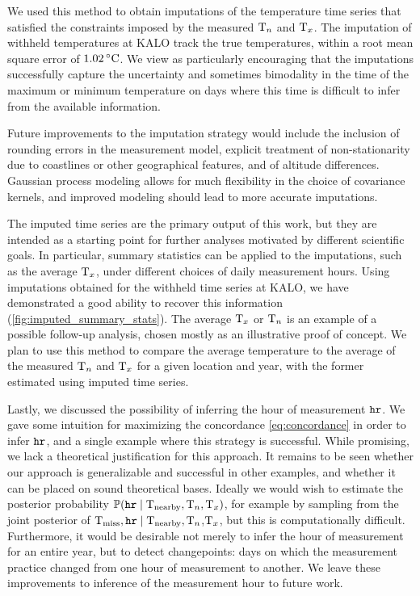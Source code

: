 \documentclass[12pt]{article}
\begin{document}
We used this method to obtain imputations of the temperature time series that satisfied the constraints imposed by the measured \(\Tn\) and \(\Tx\).
The imputation of withheld temperatures at KALO track the true temperatures, within a root mean square error of \(1.02\,\degreeC\).
We view as particularly encouraging that the imputations successfully capture the uncertainty and sometimes bimodality in the time of the maximum or minimum temperature on days where this time is difficult to infer from the available information.

Future improvements to the imputation strategy would include the inclusion of rounding errors in the measurement model, explicit treatment of non-stationarity due to coastlines or other geographical features, and of altitude differences.
Gaussian process modeling allows for much flexibility in the choice of covariance kernels, and improved modeling should lead to more accurate imputations.

The imputed time series are the primary output of this work, but they are intended as a starting point for further analyses motivated by different scientific goals.
In particular, summary statistics can be applied to the imputations, such as the average \(\Tx\), under different choices of daily measurement hours.
Using imputations obtained for the withheld time series at KALO, we have demonstrated a good ability to recover this information (\autoref{fig:imputed_summary_stats}).
The average \(\Tx\) or \(\Tn\) is an example of a possible follow-up analysis, chosen mostly as an illustrative proof of concept.
We plan to use this method to compare the average temperature to the average of the measured \(\Tn\) and \(\Tx\) for a given location and year, with the former estimated using imputed time series.

Lastly, we discussed the possibility of inferring the hour of measurement \(\hour\).
We gave some intuition for maximizing the concordance \autoref{eq:concordance} in order to infer \(\hour\), and a single example where this strategy is successful.
While promising, we lack a theoretical justification for this approach.
It remains to be seen whether our approach is generalizable and successful in other examples, and whether it can be placed on sound theoretical bases.
Ideally we would wish to estimate the posterior probability \(\Pr\del{\hour \mid \T_\obs,\Tn,\Tx}\), for example by sampling from the joint posterior of \(\T_\miss, \hour \mid \T_\obs,\)\(\Tn\),\(\Tx\), but this is computationally difficult.
Furthermore, it would be desirable not merely to infer the hour of measurement for an entire year, but to detect changepoints: days on which the measurement practice changed from one hour of measurement to another.
We leave these improvements to inference of the measurement hour to future work.
\end{document}
